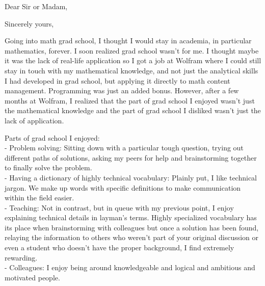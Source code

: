 \documentclass[11pt,a4paper,unicode]{moderncv}
\begin{document}

\clearpage

\date{\today} %
\opening{Dear Sir or Madam,} %
\closing{Sincerely yours,} %

\makelettertitle %

Going into math grad school, I thought I would stay in academia, in particular mathematics, forever. I soon realized grad school wasn't for me. I thought maybe it was the lack of real-life application so I got a job at Wolfram where I could still stay in touch with my mathematical knowledge, and not just the analytical skills I had developed in grad school, but applying it directly to math content management. Programming was just an added bonus. However, after a few months at Wolfram, I realized that the part of grad school I enjoyed wasn't just the mathematical knowledge and the part of grad school I disliked wasn't just the lack of application. 

Parts of grad school I enjoyed:
\\- Problem solving: Sitting down with a particular tough question, trying out different paths of solutions, asking my peers for help and brainstorming together to finally solve the problem.
\\- Having a dictionary of highly technical vocabulary: Plainly put, I like technical jargon. We make up words with specific definitions to make communication within the field easier. 
\\- Teaching: Not in contrast, but in queue with my previous point, I enjoy explaining technical details in layman's terms. Highly specialized vocabulary has its place when brainstorming with colleagues but once a solution has been found, relaying the information to others who weren't part of your original discussion or even a student who doesn't have the proper background, I find extremely rewarding.
\\- Colleagues: I enjoy being around knowledgeable and logical and ambitious and motivated people. 
\end{document}
